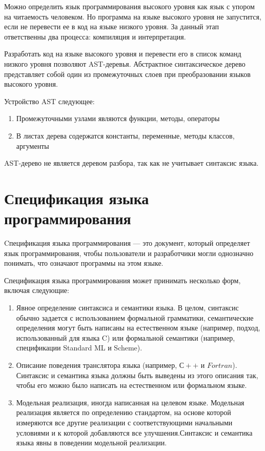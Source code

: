 \documentclass{mipt-thesis-bs}
\begin{document}
Можно определить язык программирования высокого уровня как язык с упором на читаемость человеком. Но
программа на языке высокого уровня не запустится, если не перевести ее в код на языке низкого уровня. За
данный этап ответственны два процесса: компиляция и интерпретация.

Разработать код на языке высокого уровня и перевести его в список команд низкого уровня позволяют AST-деревья.
Абстрактное синтаксическое дерево представляет собой один из промежуточных слоев при преобразовании языков
высокого уровня.

Устройство AST следующее:

\begin{enumerate}
    \item Промежуточными узлами являются функции, методы, операторы
    \item В листах дерева содержатся константы, переменные, методы классов, аргументы
\end{enumerate}

AST-дерево не является деревом разбора, так как не учитывает синтаксис языка.

\section{Спецификация языка программирования}

Cпецификация языка программирования — это документ, который определяет язык программирования, 
чтобы пользователи и разработчики могли однозначно понимать, что означают программы на этом языке.

Спецификация языка программирования может принимать несколько форм, включая следующие:

\begin{enumerate}
    \item Явное определение синтаксиса и семантики языка. В целом, синтаксис обычно 
    задается с использованием формальной грамматики, семантические определения 
    могут быть написаны на естественном языке (например, подход, использованный 
    для языка C) или формальной семантики (например, спецификации Standard ML и Scheme).
    \item Описание поведения транслятора языка (например, $С++$ и $Fortran$). 
    Синтаксис и семантика языка должны быть выведены из этого описания так, 
    чтобы его можно было написать на естественном или формальном языке.
    \item Модельная реализация, иногда написанная на целевом языке. Модельная реализация
    является по определению стандартом, на основе которой измеряются все другие реализации с 
    соответствующими начальными условиями и к которой добавляются все улучшения.Синтаксис 
    и семантика языка явны в поведении модельной реализации. 
\end{enumerate}
\end{document}
